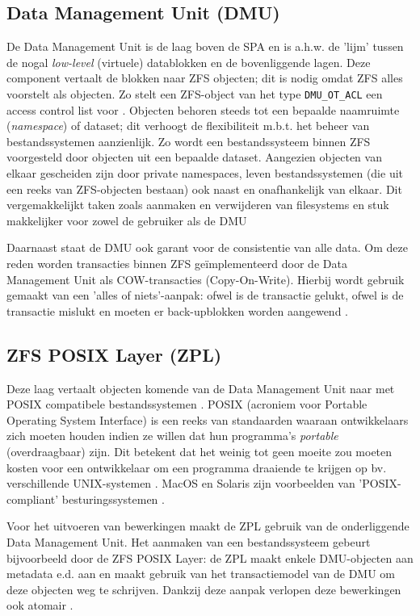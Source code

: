 \subsection{Data Management Unit (DMU)}

De Data Management Unit is de laag boven de SPA en is a.h.w. de 'lijm' tussen de nogal \textit{low-level} (virtuele) datablokken en de bovenliggende lagen. Deze component vertaalt de blokken naar ZFS objecten; dit is nodig omdat ZFS alles voorstelt als objecten. Zo stelt een ZFS-object van het type \texttt{DMU\_OT\_ACL} een access control list voor \autocite{Microsystems2006}. Objecten behoren steeds tot een bepaalde naamruimte (\textit{namespace}) of dataset; dit verhoogt de flexibiliteit m.b.t. het beheer van bestandssystemen aanzienlijk. Zo wordt een bestandssysteem binnen ZFS voorgesteld door objecten uit een bepaalde dataset. Aangezien objecten van elkaar gescheiden zijn door private namespaces, leven bestandssystemen (die uit een reeks van ZFS-objecten bestaan) ook naast en onafhankelijk van elkaar. Dit vergemakkelijkt taken zoals aanmaken en verwijderen van filesystems en stuk makkelijker voor zowel de gebruiker als de DMU \autocite{ZFSBonwick}   

Daarnaast staat de DMU ook garant voor de consistentie van alle data. Om deze reden worden transacties binnen ZFS geïmplementeerd door de Data Management Unit als COW-transacties (Copy-On-Write). Hierbij wordt gebruik gemaakt van een 'alles of niets'-aanpak: ofwel is de transactie gelukt, ofwel is de transactie mislukt en moeten er back-upblokken worden aangewend \autocite{ZFSBonwick}.

\subsection{ZFS POSIX Layer (ZPL)}

Deze laag vertaalt objecten komende van de Data Management Unit naar met POSIX compatibele bestandssystemen \autocite{ZFSBonwick}. POSIX (acroniem voor Portable Operating System Interface) is een reeks van standaarden waaraan ontwikkelaars zich moeten houden indien ze willen dat hun programma's \textit{portable} (overdraagbaar) zijn. Dit betekent dat het weinig tot geen moeite zou moeten kosten voor een ontwikkelaar om een programma draaiende te krijgen op bv. verschillende UNIX-systemen \autocite{IEEE2016}. MacOS en Solaris zijn voorbeelden van 'POSIX-compliant' besturingssystemen \autocite{GroupOnbekend}.

Voor het uitvoeren van bewerkingen maakt de ZPL gebruik van de onderliggende Data Management Unit. Het aanmaken van een bestandssysteem gebeurt bijvoorbeeld door de ZFS POSIX Layer: de ZPL maakt enkele DMU-objecten aan metadata e.d. aan en maakt gebruik van het transactiemodel van de DMU om deze objecten weg te schrijven. Dankzij deze aanpak verlopen deze bewerkingen ook atomair \autocite{ZFSBonwick}. 

